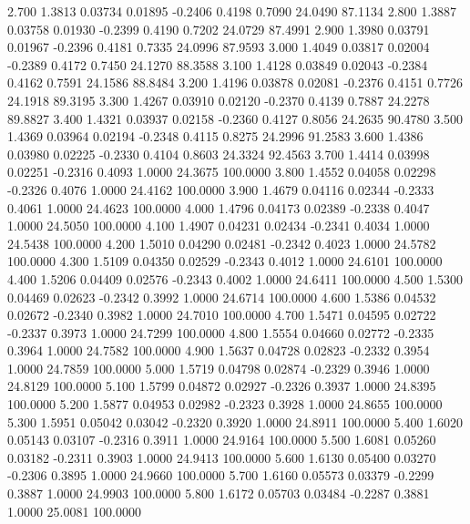    2.700   1.3813   0.03734   0.01895  -0.2406   0.4198   0.7090  24.0490  87.1134
   2.800   1.3887   0.03758   0.01930  -0.2399   0.4190   0.7202  24.0729  87.4991
   2.900   1.3980   0.03791   0.01967  -0.2396   0.4181   0.7335  24.0996  87.9593
   3.000   1.4049   0.03817   0.02004  -0.2389   0.4172   0.7450  24.1270  88.3588
   3.100   1.4128   0.03849   0.02043  -0.2384   0.4162   0.7591  24.1586  88.8484
   3.200   1.4196   0.03878   0.02081  -0.2376   0.4151   0.7726  24.1918  89.3195
   3.300   1.4267   0.03910   0.02120  -0.2370   0.4139   0.7887  24.2278  89.8827
   3.400   1.4321   0.03937   0.02158  -0.2360   0.4127   0.8056  24.2635  90.4780
   3.500   1.4369   0.03964   0.02194  -0.2348   0.4115   0.8275  24.2996  91.2583
   3.600   1.4386   0.03980   0.02225  -0.2330   0.4104   0.8603  24.3324  92.4563
   3.700   1.4414   0.03998   0.02251  -0.2316   0.4093   1.0000  24.3675 100.0000
   3.800   1.4552   0.04058   0.02298  -0.2326   0.4076   1.0000  24.4162 100.0000
   3.900   1.4679   0.04116   0.02344  -0.2333   0.4061   1.0000  24.4623 100.0000
   4.000   1.4796   0.04173   0.02389  -0.2338   0.4047   1.0000  24.5050 100.0000
   4.100   1.4907   0.04231   0.02434  -0.2341   0.4034   1.0000  24.5438 100.0000
   4.200   1.5010   0.04290   0.02481  -0.2342   0.4023   1.0000  24.5782 100.0000
   4.300   1.5109   0.04350   0.02529  -0.2343   0.4012   1.0000  24.6101 100.0000
   4.400   1.5206   0.04409   0.02576  -0.2343   0.4002   1.0000  24.6411 100.0000
   4.500   1.5300   0.04469   0.02623  -0.2342   0.3992   1.0000  24.6714 100.0000
   4.600   1.5386   0.04532   0.02672  -0.2340   0.3982   1.0000  24.7010 100.0000
   4.700   1.5471   0.04595   0.02722  -0.2337   0.3973   1.0000  24.7299 100.0000
   4.800   1.5554   0.04660   0.02772  -0.2335   0.3964   1.0000  24.7582 100.0000
   4.900   1.5637   0.04728   0.02823  -0.2332   0.3954   1.0000  24.7859 100.0000
   5.000   1.5719   0.04798   0.02874  -0.2329   0.3946   1.0000  24.8129 100.0000
   5.100   1.5799   0.04872   0.02927  -0.2326   0.3937   1.0000  24.8395 100.0000
   5.200   1.5877   0.04953   0.02982  -0.2323   0.3928   1.0000  24.8655 100.0000
   5.300   1.5951   0.05042   0.03042  -0.2320   0.3920   1.0000  24.8911 100.0000
   5.400   1.6020   0.05143   0.03107  -0.2316   0.3911   1.0000  24.9164 100.0000
   5.500   1.6081   0.05260   0.03182  -0.2311   0.3903   1.0000  24.9413 100.0000
   5.600   1.6130   0.05400   0.03270  -0.2306   0.3895   1.0000  24.9660 100.0000
   5.700   1.6160   0.05573   0.03379  -0.2299   0.3887   1.0000  24.9903 100.0000
   5.800   1.6172   0.05703   0.03484  -0.2287   0.3881   1.0000  25.0081 100.0000
